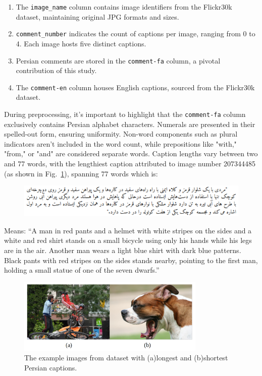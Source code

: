 \documentclass[runningheads]{llncs}
\begin{document}
\begin{enumerate}
    \item The \texttt{image\_name} column contains image identifiers from the Flickr30k dataset, maintaining original JPG formats and sizes.
    \item \texttt{comment\_number} indicates the count of captions per image, ranging from 0 to 4. Each image hosts five distinct captions.
    \item Persian comments are stored in the \texttt{comment-fa} column, a pivotal contribution of this study.
    \item The \texttt{comment-en} column houses English captions, sourced from the Flickr30k dataset.
\end{enumerate}

During preprocessing, it's important to highlight that the \texttt{comment-fa} column exclusively contains Persian alphabet characters. Numerals are presented in their spelled-out form, ensuring uniformity. Non-word components such as plural indicators aren't included in the word count, while prepositions like "with," "from," or "and" are considered separate words. Caption lengths vary between two and 77 words, with the lengthiest caption attributed to image number 207344485 (as shown in Fig.~\ref{fig2}), spanning 77 words which is:

\begin{figure}[!htbp]
  \includegraphics[width=\textwidth]{fig2.png}
\end{figure}

Means: ``A man in red pants and a helmet with white stripes on the sides and a white and red shirt stands on a small bicycle using only his hands while his legs are in the air. Another man wears a light blue shirt with dark blue patterns. Black pants with red stripes on the sides stands nearby, pointing to the first man, holding a small statue of one of the seven dwarfs.''

\begin{figure}
  \begin{center}
    \includegraphics[width=0.8\textwidth]{long_short.jpg}
    \caption{The example images from dataset with (a)longest and (b)shortest Persian captions.} \label{fig2}
  \end{center}
\end{figure}
\end{document}
